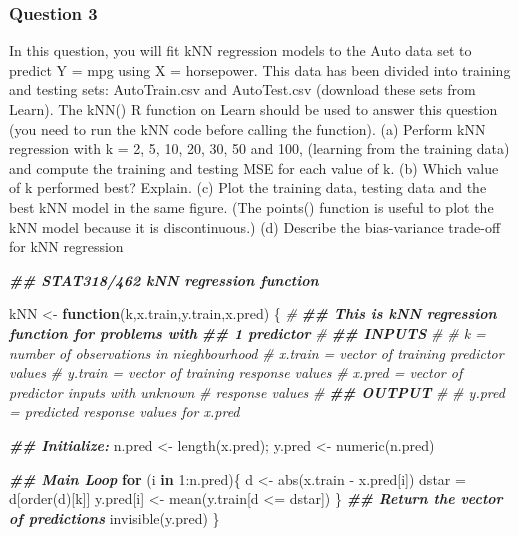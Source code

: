\documentclass[
]{article}
\newenvironment{Shaded}{\begin{snugshade}}{\end{snugshade}}
\newcommand{\CommentTok}[1]{\textcolor[rgb]{0.56,0.35,0.01}{\textit{#1}}}
\newcommand{\ControlFlowTok}[1]{\textcolor[rgb]{0.13,0.29,0.53}{\textbf{#1}}}
\newcommand{\DecValTok}[1]{\textcolor[rgb]{0.00,0.00,0.81}{#1}}
\newcommand{\DocumentationTok}[1]{\textcolor[rgb]{0.56,0.35,0.01}{\textbf{\textit{#1}}}}
\newcommand{\FunctionTok}[1]{\textcolor[rgb]{0.00,0.00,0.00}{#1}}
\newcommand{\NormalTok}[1]{#1}
\newcommand{\OtherTok}[1]{\textcolor[rgb]{0.56,0.35,0.01}{#1}}
\newcommand{\SpecialCharTok}[1]{\textcolor[rgb]{0.00,0.00,0.00}{#1}}
\begin{document}
\hypertarget{question-3}{%
\subsubsection{Question 3}\label{question-3}}

In this question, you will fit kNN regression models to the Auto data
set to predict Y = mpg using X = horsepower. This data has been divided
into training and testing sets: AutoTrain.csv and AutoTest.csv (download
these sets from Learn). The kNN() R function on Learn should be used to
answer this question (you need to run the kNN code before calling the
function). (a) Perform kNN regression with k = 2, 5, 10, 20, 30, 50 and
100, (learning from the training data) and compute the training and
testing MSE for each value of k. (b) Which value of k performed best?
Explain. (c) Plot the training data, testing data and the best kNN model
in the same figure. (The points() function is useful to plot the kNN
model because it is discontinuous.) (d) Describe the bias-variance
trade-off for kNN regression

\begin{Shaded}
\begin{Highlighting}[]
\DocumentationTok{\#\# STAT318/462 kNN regression function}

\NormalTok{kNN }\OtherTok{\textless{}{-}} \ControlFlowTok{function}\NormalTok{(k,x.train,y.train,x.pred) \{}
\CommentTok{\# }
\DocumentationTok{\#\# This is kNN regression function for problems with}
\DocumentationTok{\#\# 1 predictor}
\CommentTok{\#}
\DocumentationTok{\#\# INPUTS}
\CommentTok{\#}
\CommentTok{\# k       = number of observations in nieghbourhood }
\CommentTok{\# x.train = vector of training predictor values}
\CommentTok{\# y.train = vector of training response values}
\CommentTok{\# x.pred  = vector of predictor inputs with unknown}
\CommentTok{\#           response values }
\CommentTok{\#}
\DocumentationTok{\#\# OUTPUT}
\CommentTok{\#}
\CommentTok{\# y.pred  = predicted response values for x.pred}

\DocumentationTok{\#\# Initialize:}
\NormalTok{n.pred }\OtherTok{\textless{}{-}} \FunctionTok{length}\NormalTok{(x.pred);       y.pred }\OtherTok{\textless{}{-}} \FunctionTok{numeric}\NormalTok{(n.pred)}

\DocumentationTok{\#\# Main Loop}
\ControlFlowTok{for}\NormalTok{ (i }\ControlFlowTok{in} \DecValTok{1}\SpecialCharTok{:}\NormalTok{n.pred)\{}
\NormalTok{  d }\OtherTok{\textless{}{-}} \FunctionTok{abs}\NormalTok{(x.train }\SpecialCharTok{{-}}\NormalTok{ x.pred[i])}
\NormalTok{  dstar }\OtherTok{=}\NormalTok{ d[}\FunctionTok{order}\NormalTok{(d)[k]]}
\NormalTok{  y.pred[i] }\OtherTok{\textless{}{-}} \FunctionTok{mean}\NormalTok{(y.train[d }\SpecialCharTok{\textless{}=}\NormalTok{ dstar])        }
\NormalTok{\}}
\DocumentationTok{\#\# Return the vector of predictions}
\FunctionTok{invisible}\NormalTok{(y.pred)}
\NormalTok{\}}
\end{Highlighting}
\end{Shaded}
\end{document}
